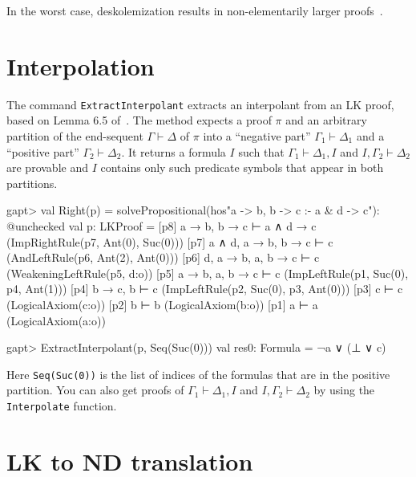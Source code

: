 \documentclass[a4paper,11pt]{book}
\newcommand{\seq}{\vdash}	%
\begin{document}
In the worst case, deskolemization results in non-elementarily larger
proofs~\cite{Aguilera2016Unsound}.

\section{Interpolation}

The command \texttt{ExtractInterpolant} extracts an interpolant from an LK
proof, based on Lemma 6.5 of~\cite{Takeuti87Proof}.  The method expects a proof
$\pi$ and an arbitrary partition of the end-sequent $\Gamma \seq \Delta$ of
$\pi$ into a ``negative part'' $\Gamma_1\seq\Delta_1$ and a ``positive part''
$\Gamma_2 \seq \Delta_2$.  It returns a formula $I$ such that
$\Gamma_1\seq\Delta_1, I$ and $I,\Gamma_2\seq\Delta_2$ are provable and $I$
contains only such predicate symbols that appear in both partitions.

\begin{clilisting}
gapt> val Right(p) = solvePropositional(hos"a -> b, b -> c :- a & d -> c"): @unchecked
val p: LKProof = [p8] a → b, b → c ⊢ a ∧ d → c    (ImpRightRule(p7, Ant(0), Suc(0)))
[p7] a ∧ d, a → b, b → c ⊢ c    (AndLeftRule(p6, Ant(2), Ant(0)))
[p6] d, a → b, a, b → c ⊢ c    (WeakeningLeftRule(p5, d:o))
[p5] a → b, a, b → c ⊢ c    (ImpLeftRule(p1, Suc(0), p4, Ant(1)))
[p4] b → c, b ⊢ c    (ImpLeftRule(p2, Suc(0), p3, Ant(0)))
[p3] c ⊢ c    (LogicalAxiom(c:o))
[p2] b ⊢ b    (LogicalAxiom(b:o))
[p1] a ⊢ a    (LogicalAxiom(a:o))

gapt> ExtractInterpolant(p, Seq(Suc(0)))
val res0: Formula = ¬a ∨ (⊥ ∨ c)

\end{clilisting}

Here \texttt{Seq(Suc(0))} is the list of indices of the formulas that are in
the positive partition.  You can also get proofs of $\Gamma_1 \vdash \Delta_1,
  I$ and $I, \Gamma_2 \vdash \Delta_2$ by using the \texttt{Interpolate}
function.

\section{LK to ND translation}
\end{document}
